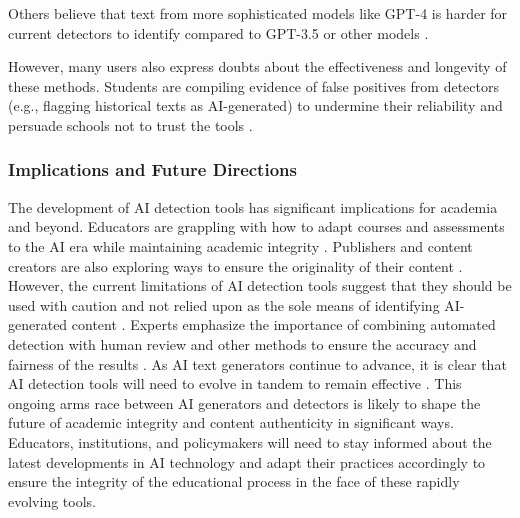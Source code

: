 \documentclass{article}
\begin{document}
Others believe that text from more sophisticated models like GPT-4 is harder for current detectors
to identify compared to GPT-3.5 or other models \cite{https://www.reddit.com/r/ChatGPT/comments/100jw27/how_you_can_bypass_ai_detection/}.

However, many users also express doubts about the effectiveness and longevity of these methods.
Students are compiling evidence of false positives from detectors (e.g., flagging historical texts as AI-generated)
to undermine their reliability and persuade schools not to trust the tools \cite{https://www.reddit.com/r/ChatGPT/comments/18f0u56/to_fool_an_ai_detector/}
\cite{https://www.reddit.com/r/OpenAI/comments/122wlot/the_best_way_to_bypass_ai_detectors/}.




\subsubsection{Implications and Future Directions}
The development of AI detection tools has significant implications for academia
and beyond. Educators are grappling with how to adapt courses and assessments
to the AI era while maintaining academic integrity
\cite{scribbr_ai_detectors}
\cite{https://kb.iu.edu/d/bimt}. Publishers and content creators are
also exploring ways to ensure the originality of their content
\cite{scribbr_ai_detectors}.
However, the current limitations of AI detection tools suggest that they
should be used with caution and not relied upon as the sole means of
identifying AI-generated content \cite{biomedcentral_ai_detection_variation}
\cite{biomedcentral_ai_detection}
\cite{https://kb.iu.edu/d/bimt}. Experts emphasize the importance of
combining automated detection with human review and other methods to ensure
the accuracy and fairness of the results \cite{biomedcentral_ai_detection_variation}
\cite{biomedcentral_ai_detection}.
As AI text generators continue to advance, it is clear that AI detection tools will
need to evolve in tandem to remain effective \cite{surferseo_ai_content_detectors}
\cite{contadu_ai_detection}
\cite{biomedcentral_ai_detection}.
This ongoing arms race between AI generators and detectors is likely to shape
the future of academic integrity and content authenticity in significant ways.
Educators, institutions, and policymakers will need to stay informed about the
latest developments in AI technology and adapt their practices accordingly to
ensure the integrity of the educational process in the face of these rapidly evolving tools.
\end{document}
